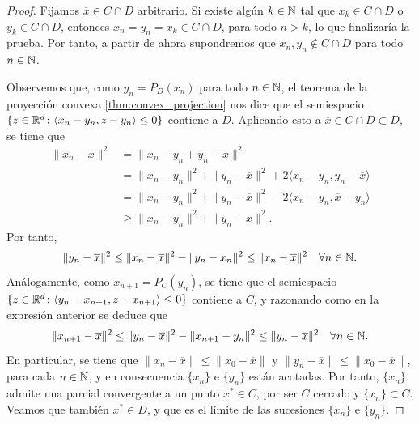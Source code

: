 \documentclass{book}
\begin{document}
\begin{proof}
	Fijamos $\overline{x} \in C\cap D$ arbitrario. Si existe algún $k \in \mathbb{N}$ tal que $x_k \in C\cap D$ o $y_k \in C\cap D$, entonces $x_n = y_n = x_k \in C \cap D$, para todo $n > k$, lo que finalizaría la prueba. Por tanto, a partir de ahora supondremos que $x_n,y_n \notin C \cap D$ para todo $n \in \mathbb{N}$.

	Observemos que, como $y_n = P_D(x_n)$ para todo $n \in \mathbb{N}$, el teorema de la proyección convexa \ref{thm:convex_projection} nos dice que el semiespacio $\{ z \in \mathbb{R}^d \colon \langle x_n - y_n, z - y_n \rangle \le 0 \}$ contiene a $D$. Aplicando esto a $\overline{x} \in C\cap D \subset D$, se tiene que
	\begin{equation*}
		\begin{split}
			\|x_n - \overline{x}\|^2 &= \|x_n - y_n + y_n - \overline{x}\|^2 \\
									 &= \|x_n - y_n\|^2 + \|y_n - \overline{x}\|^2 + 2 \langle x_n - y_n, y_n - \overline{x}\rangle \\
									 &= \|x_n - y_n\|^2 + \|y_n - \overline{x}\|^2 - 2 \langle x_n - y_n, \overline{x} - y_n\rangle \\
									 &\ge \|x_n - y_n\|^2 + \|y_n - \overline{x}\|^2. 
		\end{split}
	\end{equation*}
	Por tanto,
	\begin{equation} \label{eq:iter_proj_proof:1}
		\|y_n - \overline{x}\|^2 \le \|x_n - \overline{x}\|^2 - \|y_n - x_n\|^2 \le \|x_n - \overline{x}\|^2 \quad \forall n \in \mathbb{N}.
	\end{equation}
	Análogamente, como $x_{n+1} = P_C(y_n)$, se tiene que el semiespacio $\{ z \in \mathbb{R}^d \colon \langle y_n - x_{n+1}, z - x_{n+1} \rangle \le 0\}$ contiene a $C$, y razonando como en la expresión anterior se deduce que
	\begin{equation} \label{eq:iter_proj_proof:2}
		\|x_{n+1} - \overline{x}\|^2 \le \|y_n - \overline{x}\|^2 - \|x_{n+1} - y_n\|^2 \le \|y_n - \overline{x}\|^2 \quad \forall n \in \mathbb{N}.
	\end{equation}
	En particular, se tiene que $\|x_n - \overline{x}\| \le \|x_0 - \overline{x}\|$ y $\|y_n - \overline{x}\| \le \|x_0 - \overline{x}\|$, para cada $n \in \mathbb{N}$, y en consecuencia $\{x_n\}$ e $\{y_n\}$ están acotadas. Por tanto, $\{x_n\}$ admite una parcial convergente a un punto $x^* \in C$, por ser $C$ cerrado y $\{x_n\} \subset C$. Veamos que también $x^* \in D$, y que es el límite de las sucesiones $\{x_n\}$ e $\{y_n\}$.


\end{proof}
\end{document}
